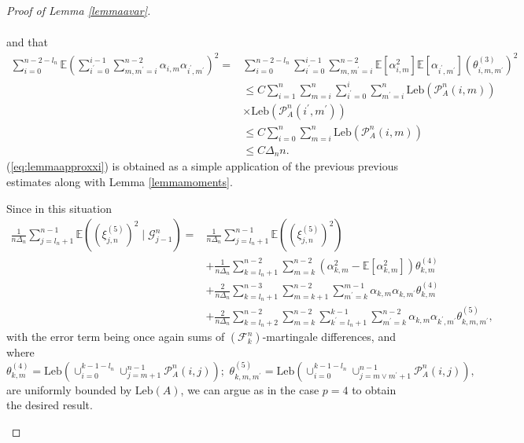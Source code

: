\documentclass{article}
\theoremstyle{plain}
\theoremstyle{definition}
\theoremstyle{remark}
\newcommand{\Leb}{\ensuremath{\mathrm{Leb}}}
\begin{document}
\begin{appendix}
\begin{proof}[Proof of Lemma \ref{lemmaavar}]
\begin{description}
\begin{align*}
		\end{align*}
		and that 
		\begin{equation}
			\begin{aligned}\sum_{i=0}^{n-2-l_{n}}\mathbb{E}\left(\sum_{i^{\prime}=0}^{i-1}\sum_{m,m^{\prime}=i}^{n-2}\alpha_{i,m}\alpha_{i^{\prime},m^{\prime}}\right)^{2}= & \sum_{i=0}^{n-2-l_{n}}\sum_{i^{\prime}=0}^{i-1}\sum_{m,m^{\prime}=i}^{n-2}\mathbb{E}[\alpha_{i,m}^{2}]\mathbb{E}[\alpha_{i^{\prime},m^{\prime}}](\theta_{i,m,m^{\prime}}^{(3)})^{2}\\
				& \leq C\sum_{i=1}^{n}\sum_{m=i}^{n}\sum_{i^{\prime}=0}^{i}\sum_{m^{\prime}=i}^{n}\Leb(\mathcal{P}_{A}^{n}(i,m))\\
				&\times\Leb(\mathcal{P}_{A}^{n}(i^{\prime},m^{\prime}))\\
				& \leq C\sum_{i=0}^{n}\sum_{m=i}^{n}\Leb(\mathcal{P}_{A}^{n}(i,m))\\
				& \leq C\Delta_{n}n.
			\end{aligned}
			\label{eq:bound2varp4}
		\end{equation}
		(\ref{eq:lemmaapproxxi}) is obtained as a simple application of the
		previous previous estimates along with Lemma  \ref{lemmamoments}.
		\item [{$p=5$:}] Since in this situation
		\begin{align*}
			\frac{1}{n\Delta_{n}}\sum_{j=l_{n}+1}^{n-1}\mathbb{E}((\xi_{j,n}^{(5)})^{2}\mid\mathscr{G}_{j-1}^{n})= & \frac{1}{n\Delta_{n}}\sum_{j=l_{n}+1}^{n-1}\mathbb{E}((\xi_{j,n}^{(5)})^{2})\\
			& +\frac{1}{n\Delta_{n}}\sum_{k=l_{n}+1}^{n-2}\sum_{m=k}^{n-2}\left(\alpha_{k,m}^{2}-\mathbb{E}[\alpha_{k,m}^{2}]\right)\theta_{k,m}^{(4)}\\
			& +\frac{2}{n\Delta_{n}}\sum_{k=l_{n}+1}^{n-3}\sum_{m=k+1}^{n-2}\sum_{m^{\prime}=k}^{m-1}\alpha_{k,m}\alpha_{k,m^{\prime}}\theta_{k,m}^{(4)}\\
			& +\frac{2}{n\Delta_{n}}\sum_{k=l_{n}+2}^{n-2}\sum_{m=k}^{n-2}\sum_{k^{\prime}=l_{n}+1}^{k-1}\sum_{m^{\prime}=k}^{n-2}\alpha_{k,m}\alpha_{k^{\prime},m^{\prime}}\theta_{k,m,m^{\prime}}^{(5)},
		\end{align*}
		with the error term being once again sums of $(\mathscr{F}_{k}^{n})$-martingale
		differences, and where 
		\begin{equation}
			\theta_{k,m}^{(4)}=\Leb(\cup_{i=0}^{k-1-l_{n}}\cup_{j=m+1}^{n-1}\mathcal{P}_{A}^{n}(i,j));\,\,\theta_{k,m,m^{\prime}}^{(5)}=\Leb(\cup_{i=0}^{k-1-l_{n}}\cup_{j=m\lor m^{\prime}+1}^{n-1}\mathcal{P}_{A}^{n}(i,j)),\label{eq:theta45def}
		\end{equation}
		are uniformly bounded by $\Leb(A)$, we can argue as in the case $p=4$ to obtain
		the desired result.
	\end{description}
	

\end{proof}
\end{appendix}
\end{document}
